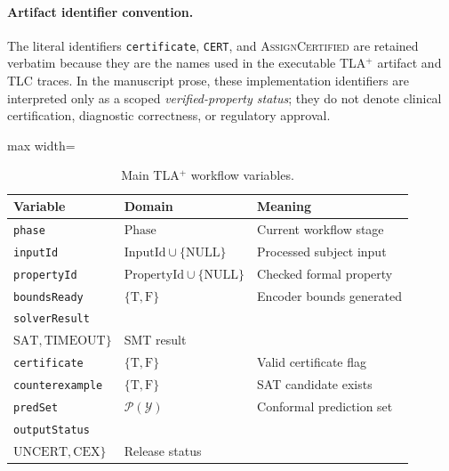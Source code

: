 \documentclass[preprint,11pt]{elsarticle}
\newcommand{\Y}{\mathcal{Y}}
\begin{document}
\paragraph{Artifact identifier convention.}
The literal identifiers \texttt{certificate}, \texttt{CERT}, and \textsc{AssignCertified} are retained verbatim because they are the names used in the executable TLA$^{+}$ artifact and TLC traces. In the manuscript prose, these implementation identifiers are interpreted only as a scoped \emph{verified-property status}; they do not denote clinical certification, diagnostic correctness, or regulatory approval.

\begin{table}[H]
\centering
\caption{Main TLA$^{+}$ workflow variables.}
\label{tab:tla_variables}
\scriptsize
\begin{adjustbox}{max width=\textwidth}
\begin{tabularx}{\textwidth}{p{2.1cm}p{3.0cm}X}
\toprule
\textbf{Variable} & \textbf{Domain} & \textbf{Meaning} \\
\midrule
\texttt{phase} & $\mathrm{Phase}$ & Current workflow stage \\
\texttt{inputId} & $\mathrm{InputId}\cup\{\mathrm{NULL}\}$ & Processed subject input \\
\texttt{propertyId} & $\mathrm{PropertyId}\cup\{\mathrm{NULL}\}$ & Checked formal property \\
\texttt{boundsReady} & $\{\mathrm{T},\mathrm{F}\}$ & Encoder bounds generated \\
\texttt{solverResult} & \makecell[l]{$\{\mathrm{NONE},\mathrm{UNSAT},$\\$\mathrm{SAT},\mathrm{TIMEOUT}\}$} & SMT result \\
\texttt{certificate} & $\{\mathrm{T},\mathrm{F}\}$ & Valid certificate flag \\
\texttt{counterexample} & $\{\mathrm{T},\mathrm{F}\}$ & SAT candidate exists \\
\texttt{predSet} & $\mathcal{P}(\Y)$ & Conformal prediction set \\
\texttt{outputStatus} & \makecell[l]{$\{\mathrm{UNREL},\mathrm{CERT},$\\$\mathrm{UNCERT},\mathrm{CEX}\}$} & Release status \\
\bottomrule
\end{tabularx}
\end{adjustbox}
\end{table}
\end{document}
